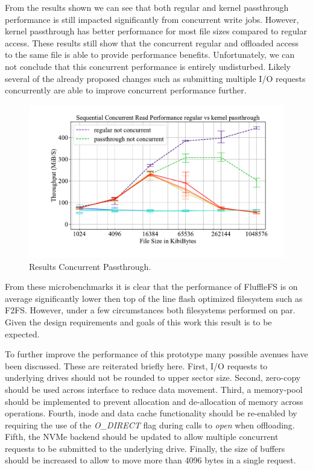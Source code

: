 From the results shown we can see that both regular and kernel passthrough
performance is still impacted significantly from concurrent write jobs.
However, kernel passthrough has better performance for most file sizes compared
to regular access. These results still show that the concurrent regular and
offloaded access to the same file is able to provide performance benefits.
Unfortunately, we can not conclude that this concurrent performance is entirely
undisturbed. Likely several of the already proposed changes such as submitting
multiple I/O requests concurrently are able to improve concurrent performance
further.

\begin{figure}[h]
    \centering
	\includegraphics[width=1\textwidth]{resources/images/results-concurrent-read.pdf}
	\caption{Results Concurrent Passthrough.}
    \label{figure:concurrentpassthrough}
\end{figure}

From these microbenchmarks it is clear that the performance of FluffleFS is
on average significantly lower then top of the line flash optimized filesystem
such as F2FS. However, under a few circumstances both filesystems
performed on par. Given the design requirements and goals of this work this
result is to be expected.

To further improve the performance of this prototype many possible avenues have
been discussed. These are reiterated briefly here. First, I/O requests to
underlying drives  should not be rounded to upper sector size. Second, zero-copy
should be used across interface to reduce data movement. Third, a memory-pool
should be implemented to prevent allocation and de-allocation of memory across
operations. Fourth, inode and data cache functionality should be re-enabled by
requiring the use of the \textit{O\_DIRECT} flag during calls to \textit{open}
when offloading. Fifth, the NVMe backend should be updated to allow multiple
concurrent requests to be submitted to the underlying drive. Finally, the
size of buffers should be increased to allow to move more than 4096 bytes in a
single request.


